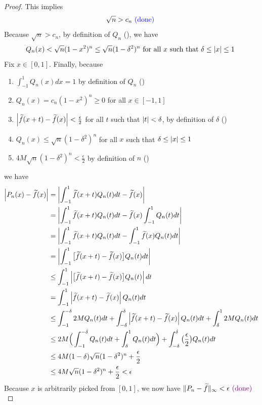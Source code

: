 \documentclass{report}
\begin{document}
\begin{proof}
This implies 
\begin{align*}
\sqrt{n}>c_n \textcolor{blue}{\text{ (done) }}
\end{align*}
Because $\sqrt{n}>c_n $, by definition of $Q_n$  (), we have 
\begin{align*}
Q_n(x)<\sqrt{n}(1-x^2)^n \leq \sqrt{n}(1-\delta^2)^n \text{ for all $x$ such that  $\delta \leq \left|x\right|\leq 1$ }
\end{align*}
Fix $x \in [0,1]$. Finally, because 
\begin{enumerate}[label=(\alph*)]
  \item $\int_{-1}^1 Q_n(x)dx=1$ by definition of  $Q_n$  ()
  \item $Q_n(x)=c_n(1-x^2)^n\geq 0$ for all $x \in [-1,1]$ 
  \item $\left|\widetilde{f}(x+t)-\widetilde{f}(x)\right|<\frac{\epsilon}{2} $ for all $t$ such that $\left|t\right|<\delta $, by definition of $\delta $ ()
  \item $Q_n(x)\leq \sqrt{n}(1-\delta^2)^n $ for all $x$ such that  $\delta\leq \left|x\right|\leq 1$
  \item $4M\sqrt{n}(1-\delta^2)^n<\frac{\epsilon}{2} $ by definition of $n$  ()
\end{enumerate}
we have
\begin{align*}
\left|P_n(x)-\widetilde{f}(x)\right|&=\left|\int_{-1}^1 \widetilde{f}(x+t)Q_n(t)dt- \widetilde{f}(x)\right|\\
&=\left|\int_{-1}^1 \widetilde{f}(x+t)Q_n(t)dt- \widetilde{f}(x)\int_{-1}^1 Q_n(t)dt \right|\\
&=\left|\int_{-1}^1 \widetilde{f}(x+t)Q_n(t)dt -\int_{-1}^1 \widetilde{f}(x)Q_n(t)dt\right|\\
&=\left|\int_{-1}^1 \big[\widetilde{f}(x+t)-\widetilde{f}(x)   \big]Q_n(t)dt\right|\\
&\leq \int_{-1}^1 \left|\big[ \widetilde{f}(x+t)-\widetilde{f}(x)\big]Q_n(t)\right|dt\\
&=\int_{-1}^1 \left|\widetilde{f}(x+t)-\widetilde{f}(x)  \right|Q_n(t)dt\\
&\leq \int_{-1}^{-\delta} 2MQ_n(t)dt +\int_{-\delta}^{\delta} \left|\widetilde{f}(x+t)-\widetilde{f}(x)  \right|Q_n(t)dt+\int_{\delta}^1 2M Q_n(t)dt\\
&\leq 2M\Big(\int_{-1}^{-\delta}Q_n(t)dt+\int_{\delta}^1 Q_n(t)dt  \Big)+ \int_{-\delta}^\delta \big(\frac{\epsilon}{2} \big)Q_n(t)dt\\
&\leq 4M(1-\delta) \sqrt{n}(1-\delta^2)^n+ \frac{\epsilon}{2} \\
&\leq 4M\sqrt{n}(1-\delta^2)^n+\frac{\epsilon}{2} <\epsilon  
\end{align*}
Because $x$ is arbitrarily picked from  $[0,1]$, we now have $\| P_n-\widetilde{f}  \|_{\infty}<\epsilon \textcolor{violet}{\text{ (done) }}$\\


\end{proof}
\end{document}
